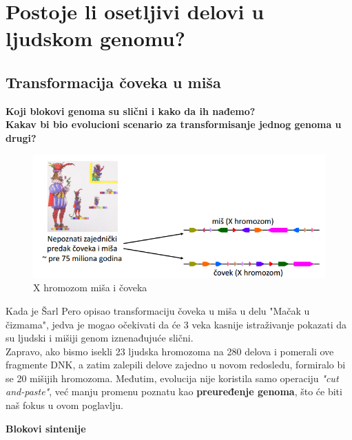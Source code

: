 \chapter {Postoje li osetljivi delovi
u ljudskom genomu?}
\setbookcodestyle

\section{Transformacija čoveka u miša}

\vspace{0.5cm}

\noindent \textbf{Koji blokovi genoma su slični i kako da ih
nađemo?}\\

\noindent \textbf{Kakav bi bio evolucioni scenario za
transformisanje jednog genoma u drugi?}\\

\begin{figure}[h!]
\includegraphics[scale=0.7]{poglavlja/6/slike/predak_X.PNG}
\caption{X hromozom miša i čoveka}
\label{slika:X}
\end{figure}

Kada je Šarl Pero opisao transformaciju čoveka u miša u delu "Mačak u čizmama", jedva je mogao očekivati da će 3 veka kasnije istraživanje pokazati da su ljudski i mišiji genom iznenađujuće slični.\\

Zapravo, ako bismo isekli 23 ljudska hromozoma na 280 delova i pomerali ove fragmente DNK, a zatim zalepili delove zajedno u novom redosledu, formiralo bi se 20 mišijih hromozoma. Međutim, evolucija nije koristila samo operaciju \textit{"cut and-paste"}, već manju promenu poznatu kao \textbf{preuređenje genoma}, što će biti naš  fokus u ovom poglavlju.\\

\newpage

\hspace{4cm}\large{\textbf{Blokovi sintenije}}\\

